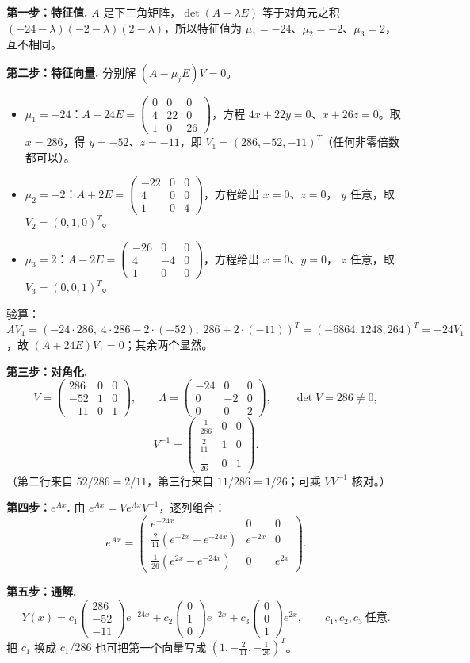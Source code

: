 \documentclass[11pt]{ctexart}
\newcommand{\pmat}[1]{\begin{pmatrix}#1\end{pmatrix}}
\begin{document}
\textbf{第一步：特征值.} $A$ 是下三角矩阵，$\det(A-\lambda E)$ 等于对角元之积
$(-24-\lambda)(-2-\lambda)(2-\lambda)$，所以特征值为
$\mu_1=-24$、$\mu_2=-2$、$\mu_3=2$，互不相同。

\textbf{第二步：特征向量.} 分别解 $(A-\mu_jE)V=0$。
\begin{itemize}
  \item $\mu_1=-24$：$A+24E=\pmat{0&0&0\\4&22&0\\1&0&26}$，方程
        $4x+22y=0$、$x+26z=0$。取 $x=286$，得 $y=-52$、$z=-11$，即
        $V_1=(286,-52,-11)^T$（任何非零倍数都可以）。
  \item $\mu_2=-2$：$A+2E=\pmat{-22&0&0\\4&0&0\\1&0&4}$，方程给出 $x=0$、$z=0$，
        $y$ 任意，取 $V_2=(0,1,0)^T$。
  \item $\mu_3=2$：$A-2E=\pmat{-26&0&0\\4&-4&0\\1&0&0}$，方程给出 $x=0$、$y=0$，
        $z$ 任意，取 $V_3=(0,0,1)^T$。
\end{itemize}
验算：$AV_1=(-24\cdot286,\;4\cdot286-2\cdot(-52),\;286+2\cdot(-11))^T
=(-6864,1248,264)^T=-24V_1$，故 $(A+24E)V_1=0$；其余两个显然。

\textbf{第三步：对角化.}
\[
V=\pmat{286&0&0\\-52&1&0\\-11&0&1},\qquad
\Lambda=\pmat{-24&0&0\\0&-2&0\\0&0&2},\qquad \det V=286\ne0,
\]
\[
V^{-1}=\pmat{\frac1{286}&0&0\\[2pt]\frac2{11}&1&0\\[2pt]\frac1{26}&0&1}.
\]
（第二行来自 $52/286=2/11$，第三行来自 $11/286=1/26$；可乘 $VV^{-1}$ 核对。）

\textbf{第四步：$e^{Ax}$.} 由 $e^{Ax}=Ve^{\Lambda x}V^{-1}$，逐列组合：
\[
e^{Ax}=\pmat{
e^{-24x}&0&0\\[3pt]
\frac2{11}\left(e^{-2x}-e^{-24x}\right)&e^{-2x}&0\\[3pt]
\frac1{26}\left(e^{2x}-e^{-24x}\right)&0&e^{2x}}.
\]

\textbf{第五步：通解.}
\[
Y(x)=c_1\pmat{286\\-52\\-11}e^{-24x}
+c_2\pmat{0\\1\\0}e^{-2x}
+c_3\pmat{0\\0\\1}e^{2x},\qquad c_1,c_2,c_3\ \text{任意}.
\]
把 $c_1$ 换成 $c_1/286$ 也可把第一个向量写成 $(1,-\frac2{11},-\frac1{26})^T$。
\end{document}
